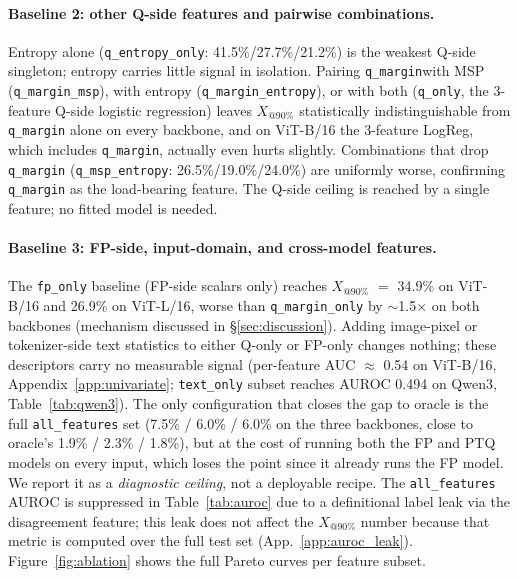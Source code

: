 \documentclass{article}
\makeatletter
\newcommand{\fp}{\textsc{FP}\xspace}
\newcommand{\ptq}{\textsc{PTQ}\xspace}
\newcommand{\xat}[1]{\ensuremath{X_{@#1\%}}}
\makeatother
\begin{document}
\paragraph{Baseline 2: other Q-side features and pairwise combinations.}
Entropy alone (\texttt{q\_entropy\_only}: 41.5\%/27.7\%/21.2\%) is the weakest Q-side singleton; entropy carries little signal in isolation. Pairing \texttt{q\_margin}with MSP (\texttt{q\_margin\_msp}), with entropy (\texttt{q\_margin\_entropy}), or with both (\texttt{q\_only}, the 3-feature Q-side logistic regression) leaves \xat{90} statistically indistinguishable from \texttt{q\_margin} alone on every backbone, and on ViT-B/16 the 3-feature LogReg, which includes \texttt{q\_margin}, actually even hurts slightly. Combinations that drop \texttt{q\_margin} (\texttt{q\_msp\_entropy}: 26.5\%/19.0\%/24.0\%) are uniformly worse, confirming \texttt{q\_margin} as the load-bearing feature. The Q-side ceiling is reached by a single feature; no fitted model is needed.

\paragraph{Baseline 3: FP-side, input-domain, and cross-model features.}
The \texttt{fp\_only} baseline (\fp{}-side scalars only) reaches \xat{90} $=$ 34.9\% on ViT-B/16 and 26.9\% on ViT-L/16, worse than \texttt{q\_margin\_only} by $\sim$1.5$\times$ on both backbones (mechanism discussed in \S\ref{sec:discussion}). Adding image-pixel or tokenizer-side text statistics to either Q-only or FP-only changes nothing; these descriptors carry no measurable signal (per-feature AUC $\approx$ 0.54 on ViT-B/16, Appendix~\ref{app:univariate}; \texttt{text\_only} subset reaches AUROC 0.494 on Qwen3, Table~\ref{tab:qwen3}). The only configuration that closes the gap to oracle is the full \texttt{all\_features} set (7.5\% / 6.0\% / 6.0\% on the three backbones, close to oracle's 1.9\% / 2.3\% / 1.8\%), but at the cost of running both the \fp{} and \ptq{} models on every input, which loses the point since it already runs the FP model. We report it as a \emph{diagnostic ceiling}, not a deployable recipe. The \texttt{all\_features} AUROC is suppressed in Table~\ref{tab:auroc} due to a definitional label leak via the disagreement feature; this leak does not affect the \xat{90} number because that metric is computed over the full test set (App.~\ref{app:auroc_leak}). Figure~\ref{fig:ablation} shows the full Pareto curves per feature subset.
\end{document}
